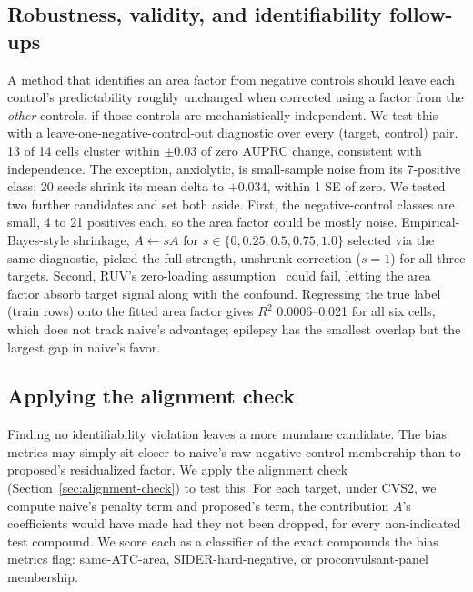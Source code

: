 \documentclass{llncs}
\begin{document}
\subsection{Robustness, validity, and identifiability follow-ups}
\label{sec:shrinkage}
\label{sec:overlap}
A method that identifies an area factor from negative controls should leave each control's predictability roughly unchanged when corrected using a factor from the \emph{other} controls, if those controls are mechanistically independent. We test this with a leave-one-negative-control-out diagnostic over every (target, control) pair. 13 of 14 cells cluster within $\pm0.03$ of zero AUPRC change, consistent with independence. The exception, anxiolytic, is small-sample noise from its 7-positive class: 20 seeds shrink its mean delta to $+0.034$, within 1 SE of zero. We tested two further candidates and set both aside. First, the negative-control classes are small, 4 to 21 positives each, so the area factor could be mostly noise. Empirical-Bayes-style shrinkage, $A \leftarrow sA$ for $s \in \{0, 0.25, 0.5, 0.75, 1.0\}$ selected via the same diagnostic, picked the full-strength, unshrunk correction ($s=1$) for all three targets. Second, RUV's zero-loading assumption~\cite{gerard2021ruvstar} could fail, letting the area factor absorb target signal along with the confound. Regressing the true label (train rows) onto the fitted area factor gives $R^2$ 0.0006--0.021 for all six cells, which does not track naive's advantage; epilepsy has the smallest overlap but the largest gap in naive's favor.

\subsection{Applying the alignment check}
\label{sec:alignment}
Finding no identifiability violation leaves a more mundane candidate. The bias metrics may simply sit closer to naive's raw negative-control membership than to proposed's residualized factor. We apply the alignment check (Section~\ref{sec:alignment-check}) to test this. For each target, under CVS2, we compute naive's penalty term and proposed's term, the contribution $A$'s coefficients would have made had they not been dropped, for every non-indicated test compound. We score each as a classifier of the exact compounds the bias metrics flag: same-ATC-area, SIDER-hard-negative, or proconvulsant-panel membership.
\end{document}
